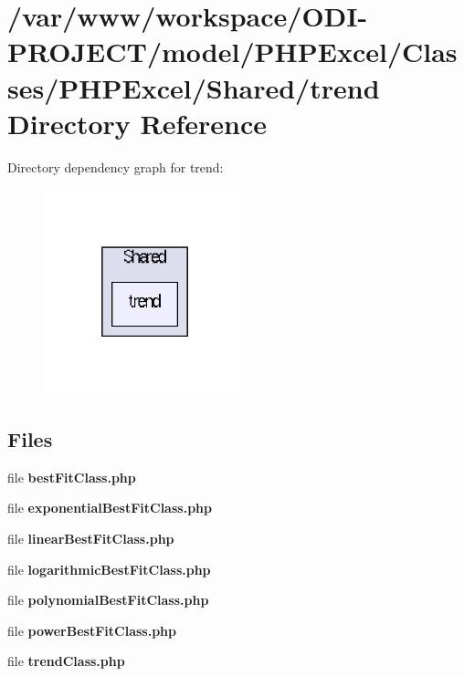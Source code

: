 \section{/var/www/workspace/\+O\+D\+I-\/\+P\+R\+O\+J\+E\+C\+T/model/\+P\+H\+P\+Excel/\+Classes/\+P\+H\+P\+Excel/\+Shared/trend Directory Reference}
\label{dir_a0274b07ae6eb615f81a19b55d9338fd}
Directory dependency graph for trend\+:\nopagebreak
\begin{figure}[H]
\begin{center}
\leavevmode
\includegraphics[width=166pt]{dir_a0274b07ae6eb615f81a19b55d9338fd_dep}
\end{center}
\end{figure}
\subsection*{Files}
\begin{DoxyCompactItemize}
\item 
file {\bfseries best\+Fit\+Class.\+php}
\item 
file {\bfseries exponential\+Best\+Fit\+Class.\+php}
\item 
file {\bfseries linear\+Best\+Fit\+Class.\+php}
\item 
file {\bfseries logarithmic\+Best\+Fit\+Class.\+php}
\item 
file {\bfseries polynomial\+Best\+Fit\+Class.\+php}
\item 
file {\bfseries power\+Best\+Fit\+Class.\+php}
\item 
file {\bfseries trend\+Class.\+php}
\end{DoxyCompactItemize}
